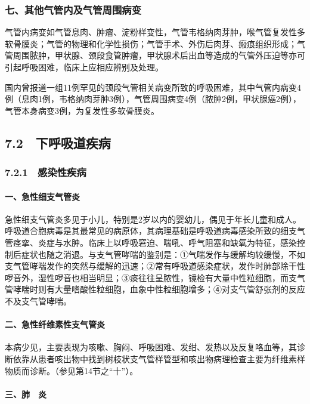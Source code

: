 \subsubsection{七、其他气管内及气管周围病变}

气管内病变如气管息肉、肿瘤、淀粉样变性，气管韦格纳肉芽肿，喉气管复发性多软骨膜炎；气管的物理和化学性损伤；气管手术、外伤后肉芽、瘢痕组织形成；气管周围脓肿，甲状腺、颈段食管肿瘤，甲状腺术后出血等造成的气管外压迫等亦可引起呼吸困难，临床上应相应辨别及处理。

国内曾报道一组11例罕见的颈段气管相关病变所致的呼吸困难，其中气管内病变4例（息肉1例，韦格纳肉芽肿3例），气管周围病变4例（脓肿2例，甲状腺癌2例），气管本身病变3例，为复发性多软骨膜炎。

\protect\hypertarget{text00046.html}{}{}

\subsection{7.2　下呼吸道疾病}

\subsubsection{7.2.1　感染性疾病}

\paragraph{一、急性细支气管炎}

急性细支气管炎多见于小儿，特别是2岁以内的婴幼儿，偶见于年长儿童和成人。呼吸道合胞病毒是其最常见的病原体，其病理基础是呼吸道病毒感染所致的细支气管痉挛、炎症与水肿。临床上以呼吸窘迫、喘吼、呼气阻塞和缺氧为特征，感染控制后症状也随之消退。与支气管哮喘的鉴别是：①气喘发作与缓解均较缓慢，不如支气管哮喘发作的突然与缓解的迅速；②常有呼吸道感染症状，发作时肺部除干性啰音外，湿性啰音也相当明显；③痰往往呈脓性，镜检有大量中性粒细胞，而支气管哮喘时则有大量嗜酸性粒细胞，血象中性粒细胞增多；④对支气管舒张剂的反应不及支气管哮喘。

\paragraph{二、急性纤维素性支气管炎}

本病少见，主要表现为咳嗽、胸闷、呼吸困难、发绀、发热以及反复咯血等，其诊断依靠从患者咳出物中找到树枝状支气管样管型和咳出物病理检查主要为纤维素样物质而诊断。（参见第14节之“十”）。

\paragraph{三、肺　炎}


